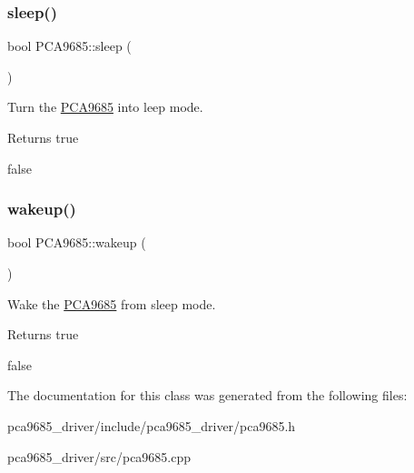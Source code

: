\subsubsection{\texorpdfstring{sleep()}{sleep()}}
{\footnotesize\ttfamily bool P\+C\+A9685\+::sleep (\begin{DoxyParamCaption}{ }\end{DoxyParamCaption})}



Turn the \hyperlink{class_p_c_a9685}{P\+C\+A9685} into leep mode. 

\begin{DoxyReturn}{Returns}
true 

false 
\end{DoxyReturn}
\mbox{\label{class_p_c_a9685_a183c1dfbe7eb9589653f9461ad6e4642}} 
\subsubsection{\texorpdfstring{wakeup()}{wakeup()}}
{\footnotesize\ttfamily bool P\+C\+A9685\+::wakeup (\begin{DoxyParamCaption}{ }\end{DoxyParamCaption})}



Wake the \hyperlink{class_p_c_a9685}{P\+C\+A9685} from sleep mode. 

\begin{DoxyReturn}{Returns}
true 

false 
\end{DoxyReturn}


The documentation for this class was generated from the following files\+:\begin{DoxyCompactItemize}
\item 
pca9685\+\_\+driver/include/pca9685\+\_\+driver/pca9685.\+h\item 
pca9685\+\_\+driver/src/pca9685.\+cpp\end{DoxyCompactItemize}
